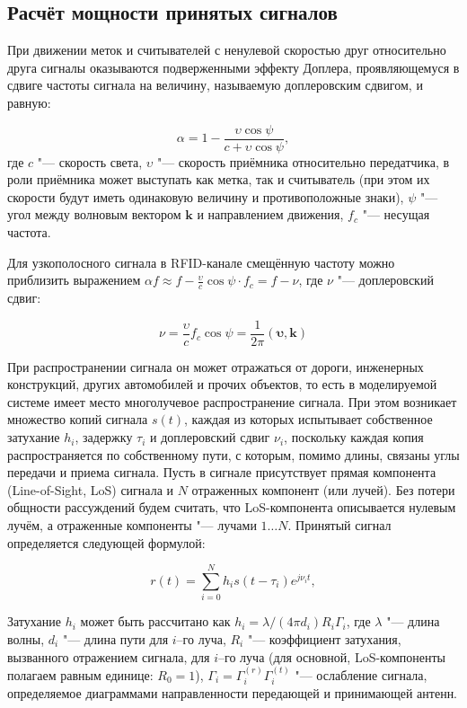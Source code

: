 \subsection{Расчёт мощности принятых сигналов}

При движении меток и считывателей с ненулевой скоростью друг относительно друга сигналы оказываются подверженными эффекту Доплера, проявляющемуся в сдвиге частоты сигнала на величину, называемую доплеровским сдвигом, и равную:

$$
	\alpha = 1 - \frac{\upsilon \cos{\psi}}{c+\upsilon \cos{\psi}},
$$
где $c$ "--- скорость света, $\upsilon$ "--- скорость приёмника относительно передатчика, в роли приёмника может выступать как метка, так и считыватель (при этом их скорости будут иметь одинаковую величину и противоположные знаки), $\psi$ "--- угол между волновым вектором $\bm{k}$ и направлением движения, $f_c$ "--- несущая частота.

Для узкополосного сигнала в RFID-канале смещённую частоту можно приблизить выражением $\alpha f \approx f - \frac{\upsilon}{c}\cos{\psi} \cdot f_c = f - \nu$, где $\nu$ "--- доплеровский сдвиг:

$$
	\nu = \frac{\upsilon}{c} f_c\cos{\psi} = \frac{1}{2\pi}(\bm{\upsilon},\bm{k})
$$

При распространении сигнала он может отражаться от дороги, инженерных конструкций, других автомобилей и прочих объектов, то есть в моделируемой системе имеет место многолучевое распространение сигнала. При этом возникает множество копий сигнала $s(t)$, каждая из которых испытывает собственное затухание $h_i$, задержку $\tau_i$ и доплеровский сдвиг $\nu_i$, поскольку каждая копия распространяется по собственному пути, с которым, помимо длины, связаны углы передачи и приема сигнала. Пусть в сигнале присутствует прямая компонента (Line-of-Sight, LoS) сигнала и $N$ отраженных компонент (или лучей). Без потери общности рассуждений будем считать, что LoS-компонента описывается нулевым лучём, а отраженные компоненты "--- лучами $1 \dots N$. Принятый сигнал определяется следующей формулой:

\begin{equation}
	r(t) = \sum\limits_{i=0}^{N} h_i s(t-\tau_i) e^{j\nu_i t},
	\label{eq:ch2_rx_signal}
\end{equation}

Затухание $h_i$ может быть рассчитано как $h_i=\lambda/(4\pi d_i)R_i\Gamma_i$, где $\lambda$ "--- длина волны, $d_i$ "--- длина пути для $i$--го луча, $R_i$ "--- коэффициент затухания, вызванного отражением сигнала, для $i$--го луча (для основной, LoS-компоненты полагаем равным единице: $R_0=1$), $\Gamma_i = \Gamma_i^{(r)}\Gamma_i^{(t)}$ "--- ослабление сигнала, определяемое диаграммами направленности передающей и принимающей антенн.

